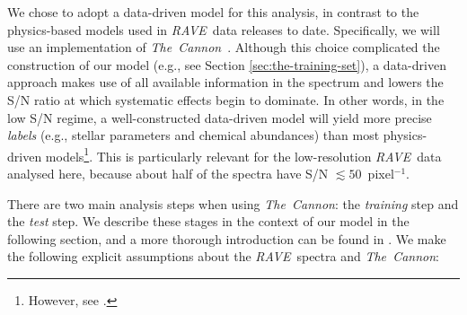 \documentclass[preprint]{aastex}
\newcommand{\acronym}[1]{{\small{#1}}}
\newcommand{\project}[1]{\textsl{#1}}
\newcommand{\thecannon}{\project{The~Cannon}}
\newcommand{\rave}{\project{\acronym{RAVE}}}
\begin{document}
We chose to adopt a data-driven model for this analysis, in contrast to the
physics-based models used in \rave\ data releases to date.  Specifically, we will
use an implementation of \thecannon\ \citep{Ness_2015,Ness_2016}.  Although this 
choice complicated the construction of our model (e.g., see Section 
\ref{sec:the-training-set}), a data-driven approach makes use of all available 
information in the spectrum and lowers the S/N ratio at which systematic effects 
begin to dominate.  In other words, in the low S/N regime, a well-constructed 
data-driven model will yield more precise \emph{labels} (e.g., stellar parameters 
and chemical abundances) than most physics-driven models\footnote{However, see 
\citet{Casey_2016a}.}.  This is particularly relevant for the low-resolution 
\rave\ data analysed here, because about half of the spectra have S/N 
$\lesssim 50$~pixel$^{-1}$.


There are two main analysis steps when using \thecannon: the \emph{training} 
step and the \emph{test} step.  We describe these stages in the context of our
model in the following section, and a more thorough introduction can be found
in \citet{Ness_2015}.  We make the following explicit assumptions about the 
\rave\ spectra and \thecannon:
\end{document}
